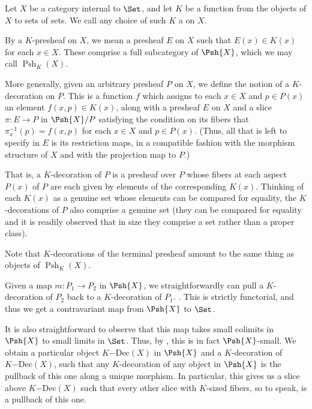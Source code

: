 \newcommand{\KPshGlobal}[2]{\operatorname{Psh}_{#1}(#2)}

\newcommand{\KDecObject}[2]{#1\mathrm{-Dec}(#2)}


Let $X$ be a category internal to $\Set$, and let $K$ be a function from the objects of $X$ to sets of sets. We call any choice of such $K$ a  on $X$.

By a $K$-presheaf on $X$, we mean a presheaf $E$ on $X$ such that $E(x) \in K(x)$ for each $x \in X$. These comprise a full subcategory of $\Psh{X}$, which we may call $\KPshGlobal{K}{X}$.

More generally, given an arbitrary presheaf $P$ on $X$, we define the notion of a $K$-decoration on $P$. This is a function $f$ which assigns to each $x \in X$ and $p \in P(x)$ an element $f(x, p) \in K(x)$, along with a presheaf $E$ on $X$ and a slice $\pi : E \to P$ in $\Psh{X}/P$ satisfying the condition on its fibers that $\pi_x^{-1}(p) = f(x, p)$ for each $x \in X$ and $p \in P(x)$. (Thus, all that is left to specify in $E$ is its restriction maps, in a compatible fashion with the morphism structure of $X$ and with the projection map to $P$.)

That is, a $K$-decoration of $P$ is a presheaf over $P$ whose fibers at each aspect $P(x)$ of $P$ are each given by elements of the corresponding $K(x)$. Thinking of each $K(x)$ as a genuine set whose elements can be compared for equality, the $K$-decorations of $P$ also comprise a genuine set (they can be compared for equality and it is readily observed that in size they comprise a set rather than a proper class).

Note that $K$-decorations of the terminal presheaf amount to the same thing as objects of $\KPshGlobal{K}{X}$.

Given a map $m : P_1 \to P_2$ in $\Psh{X}$, we straightforwardly can pull a $K$-decoration of $P_2$ back to a $K$-decoration of $P_1$. . This is strictly functorial, and thus we get a contravariant map from $\Psh{X}$ to $\Set$.

It is also straightforward to observe that this map takes small colimits in $\Psh{X}$ to small limits in $\Set$. Thus, by , this is in fact $\Psh{X}$-small. We obtain a particular object $\KDecObject{K}{X}$ in $\Psh{X}$ and a $K$-decoration of $\KDecObject{K}{X}$, such that any $K$-decoration of any object in $\Psh{X}$ is the pullback of this one along a unique morphism. In particular, this gives us a slice above $\KDecObject{K}{X}$ such that every other slice with $K$-sized fibers, so to speak, is a pullback of this one.

